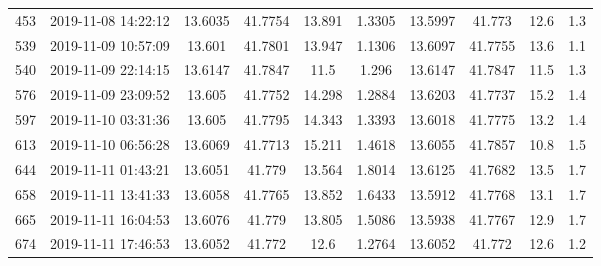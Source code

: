 \documentclass[a4paper,12pt]{article}
\begin{document}
\begin{landscape}
\begin{table}
\begin{center}
\begin{tabular}{@{} c c c c c c c c c c}
453 & 2019-11-08 14:22:12 & 13.6035 & 41.7754 & 13.891 & 1.3305 & 13.5997 & 41.773 & 12.6 & 1.3 \\
539 & 2019-11-09 10:57:09 & 13.601 & 41.7801 & 13.947 & 1.1306 & 13.6097 & 41.7755 & 13.6 & 1.1 \\
540 & 2019-11-09 22:14:15 & 13.6147 & 41.7847 & 11.5 & 1.296 & 13.6147 & 41.7847 & 11.5 & 1.3 \\
576 & 2019-11-09 23:09:52 & 13.605 & 41.7752 & 14.298 & 1.2884 & 13.6203 & 41.7737 & 15.2 & 1.4 \\
597 & 2019-11-10 03:31:36 & 13.605 & 41.7795 & 14.343 & 1.3393 & 13.6018 & 41.7775 & 13.2 & 1.4 \\
613 & 2019-11-10 06:56:28 & 13.6069 & 41.7713 & 15.211 & 1.4618 & 13.6055 & 41.7857 & 10.8 & 1.5 \\
644 & 2019-11-11 01:43:21 & 13.6051 & 41.779 & 13.564 & 1.8014 & 13.6125 & 41.7682 & 13.5 & 1.7 \\
658 & 2019-11-11 13:41:33 & 13.6058 & 41.7765 & 13.852 & 1.6433 & 13.5912 & 41.7768 & 13.1 & 1.7 \\
665 & 2019-11-11 16:04:53 & 13.6076 & 41.779 & 13.805 & 1.5086 & 13.5938 & 41.7767 & 12.9 & 1.7 \\
674 & 2019-11-11 17:46:53 & 13.6052 & 41.772 & 12.6 & 1.2764 & 13.6052 & 41.772 & 12.6 & 1.2 \\
    \end{tabular}
 \label{tab:velocitymodel}
\end{center}
\end{table}

\end{landscape}
\end{document}
